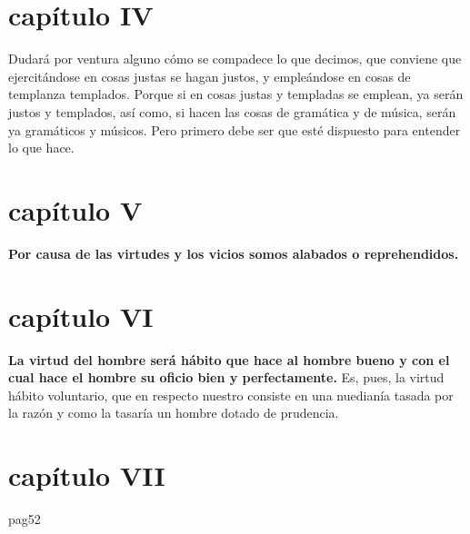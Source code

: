 \begin{multicols}{2}
\section*{capítulo IV}
Dudará por ventura alguno cómo se compadece lo que decimos, que conviene que ejercitándose en cosas justas se hagan justos, y empleándose en cosas de templanza templados. Porque si en cosas justas y
templadas se emplean, ya serán justos y templados, así como, si hacen las cosas de gramática y de música, serán ya gramáticos y músicos. Pero primero debe ser que esté dispuesto para entender lo que hace.\\

\section*{capítulo V}
\textbf{Por causa de las virtudes y los vicios somos alabados o reprehendidos.}\\

\section*{capítulo VI}
\textbf{La virtud del hombre será hábito que hace al hombre bueno y con el cual hace el hombre su oficio bien y perfectamente.} 
Es, pues, la virtud hábito voluntario, que en respecto nuestro consiste en una nuedianía tasada por la razón y como la tasaría un hombre dotado de prudencia.

\section*{capítulo VII}
pag52

\end{multicols}

